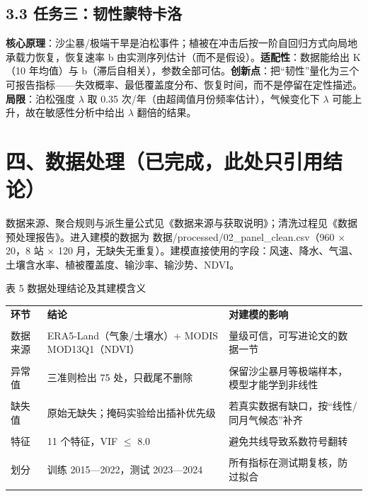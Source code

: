 \documentclass[11pt,a4paper]{ctexart}
\begin{document}
\subsection*{3.3 任务三：韧性蒙特卡洛}
\textbf{核心原理}：沙尘暴/极端干旱是泊松事件；植被在冲击后按一阶自回归方式向局地承载力恢复，恢复速率 b 由实测序列估计（而不是假设）。\textbf{适配性}：数据能给出 K（10 年均值）与 b（滞后自相关），参数全部可估。\textbf{创新点}：把“韧性”量化为三个可报告指标——失效概率、最低覆盖度分布、恢复时间，而不是停留在定性描述。\textbf{局限}：泊松强度 ${\lambda}$ 取 0.35 次/年（由超阈值月份频率估计），气候变化下 ${\lambda}$ 可能上升，故在敏感性分析中给出 ${\lambda}$ 翻倍的结果。


\section*{四、数据处理（已完成，此处只引用结论）}
数据来源、聚合规则与派生量公式见《数据来源与获取说明》；清洗过程见《数据预处理报告》。进入建模的数据为 数据/processed/02\_panel\_clean.csv（960 $\times$ 20，8 站 $\times$ 120 月，无缺失无重复）。建模直接使用的字段：风速、降水、气温、土壤含水率、植被覆盖度、输沙率、输沙势、NDVI。

表 5  数据处理结论及其建模含义


\begin{table}[H]\centering\small\setlength{\parskip}{2pt}
\begin{tabularx}{\textwidth}{|X|X|X|}
\toprule
\textbf{环节} & \textbf{结论} & \textbf{对建模的影响} \\\\
\midrule
数据来源 & ERA5-Land（气象/土壤水）+ MODIS MOD13Q1（NDVI） & 量级可信，可写进论文的数据一节 \\\\
异常值 & 三准则检出 75 处，只截尾不删除 & 保留沙尘暴月等极端样本，模型才能学到非线性 \\\\
缺失值 & 原始无缺失；掩码实验给出插补优先级 & 若真实数据有缺口，按“线性/同月气候态”补齐 \\\\
特征 & 11 个特征，VIF $\le$ 8.0 & 避免共线导致系数符号翻转 \\\\
划分 & 训练 2015—2022，测试 2023—2024 & 所有指标在测试期复核，防过拟合 \\\\
\bottomrule
\end{tabularx}
\end{table}
\end{document}
